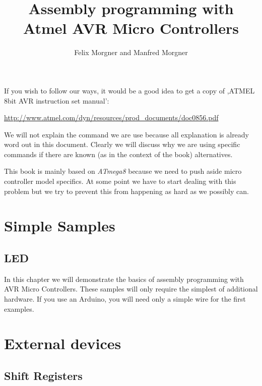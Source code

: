 \documentclass[twoside,english,12pt,authoryear,openright]{book}
\newcommand{\at}{\textit{ATmega8} }
\begin{document}

\title{Assembly programming with Atmel AVR Micro Controllers}

\author{Felix Morgner and Manfred Morgner}


\maketitle

If you wish to follow our ways, it would be a good idea to get a copy of  ,ATMEL 8bit AVR instruction set manual':

\url{http://www.atmel.com/dyn/resources/prod_documents/doc0856.pdf}

We will not explain the command we are use because all explanation is already word out in this document. Clearly we will discuss why we are using specific commands if there are known (as in the context of the book) alternatives.

This book is mainly based on \at because we need to push aside micro controller model specifics. At some point we have to start dealing with this problem but we try to prevent this from happening as hard as we possibly can.

\tableofcontents{}


\part{Simple Samples}

\chapter{LED}

In this chapter we will demonstrate the basics of assembly programming with AVR Micro Controllers. These samples
will only require the simplest of additional hardware. If you use an Arduino, you will need only a simple wire for the first
examples.







\part{External devices}

\chapter{Shift Registers}


\end{document}
